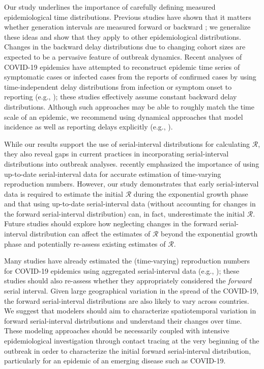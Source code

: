\documentclass[12pt]{article}
\newcommand{\RR}{\ensuremath{{\mathcal R}}\xspace}
\begin{document}
Our study underlines the importance of carefully defining measured epidemiological time distributions.
Previous studies have shown that it matters whether generation
intervals are measured forward or backward \citep{nishiura2010time,champredon2015intrinsic,britton2019estimation};
we generalize these ideas and show that they apply to other epidemiological distributions.
Changes in the backward delay distributions due to changing cohort sizes are expected to be a pervasive feature of outbreak dynamics.
Recent analyses of COVID-19 epidemics have attempted to reconstruct epidemic time series of symptomatic cases or infected cases from the reports of confirmed cases by using time-independent delay distributions from infection or symptom onset to reporting (e.g., \cite{tempvar, park2020potential,scire2020reproductive,shim2020transmission});
these studies effectively assume constant backward delay distributions.
Although such approaches may be able to roughly match the time scale of an epidemic, we recommend using dynamical approaches that model incidence as well as reporting delays explicitly (e.g., \cite{flaxman2020estimating}).

While our results support the use of serial-interval distributions for calculating \RR, 
they also reveal gaps in current practices in incorporating serial-interval distributions into outbreak analyses.
\cite{thompson2019improved} recently emphasized the importance of using up-to-date serial-interval data for accurate estimation of time-varying reproduction numbers.
However, our study demonstrates that early serial-interval data is required to estimate the initial \RR during the exponential growth phase and that using up-to-date serial-interval data (without accounting for changes in the forward serial-interval distribution) can, in fact, underestimate the initial \RR.
Future studies should explore how neglecting changes in the forward serial-interval distribution can affect the estimates of \RR beyond the exponential growth phase and potentially re-assess existing estimates of \RR.

Many studies have already estimated the (time-varying) reproduction numbers for COVID-19 epidemics using aggregated serial-interval data (e.g., \cite{tempvar,du2020serial,pan2020jama,zhang2020evolving});
these studies should also re-assess whether they appropriately considered the \emph{forward} serial interval.
Given large geographical variation in the spread of the COVID-19, the forward serial-interval distributions are also likely to vary across countries.
We suggest that modelers should aim to characterize spatiotemporal variation in forward serial-interval distributions and understand their changes over time.
These modeling approaches should be necessarily coupled with intensive
epidemiological investigation through contact tracing at the very
beginning of the outbreak in order to characterize the initial forward
serial-interval distribution, particularly for an epidemic of an
emerging disease such as COVID-19.
\end{document}

